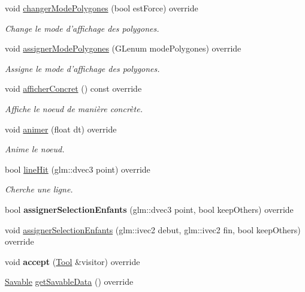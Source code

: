 \begin{DoxyCompactItemize}
void \hyperlink{group__inf2990_ga90bb01067866438b80d081967c133b81}{changer\-Mode\-Polygones} (bool est\-Force) override
\begin{DoxyCompactList}\small\item\em Change le mode d'affichage des polygones. \end{DoxyCompactList}\item 
void \hyperlink{group__inf2990_ga5caf8a3f9e06915463abdff7a473d95f}{assigner\-Mode\-Polygones} (G\-Lenum mode\-Polygones) override
\begin{DoxyCompactList}\small\item\em Assigne le mode d'affichage des polygones. \end{DoxyCompactList}\item 
void \hyperlink{group__inf2990_ga023450b00e424ff3600a93a6c844b4ad}{afficher\-Concret} () const override
\begin{DoxyCompactList}\small\item\em Affiche le noeud de manière concrète. \end{DoxyCompactList}\item 
void \hyperlink{group__inf2990_gac641c70147959a57b698854e016ff929}{animer} (float dt) override
\begin{DoxyCompactList}\small\item\em Anime le noeud. \end{DoxyCompactList}\item 
bool \hyperlink{group__inf2990_gaf1aff36b4974423ea872caedd0d5b129}{line\-Hit} (glm\-::dvec3 point) override
\begin{DoxyCompactList}\small\item\em Cherche une ligne. \end{DoxyCompactList}\item 
\hypertarget{group__inf2990_ga60b49df4f31e029056837529970ef67f}{bool {\bfseries assigner\-Selection\-Enfants} (glm\-::dvec3 point, bool keep\-Others) override}\label{group__inf2990_ga60b49df4f31e029056837529970ef67f}

\item 
void \hyperlink{group__inf2990_ga98e4e00d1d92ebe6774f72dc712ee6ca}{assigner\-Selection\-Enfants} (glm\-::ivec2 debut, glm\-::ivec2 fin, bool keep\-Others) override
\item 
\hypertarget{group__inf2990_ga0b60c180726f3a0501f42bc70bc0c52e}{void {\bfseries accept} (\hyperlink{class_tool}{Tool} \&visitor) override}\label{group__inf2990_ga0b60c180726f3a0501f42bc70bc0c52e}

\item 
\hyperlink{class_savable}{Savable} \hyperlink{group__inf2990_ga3fefd2b70f384f82cb6319f468c01a63}{get\-Savable\-Data} () override
\end{DoxyCompactItemize}

